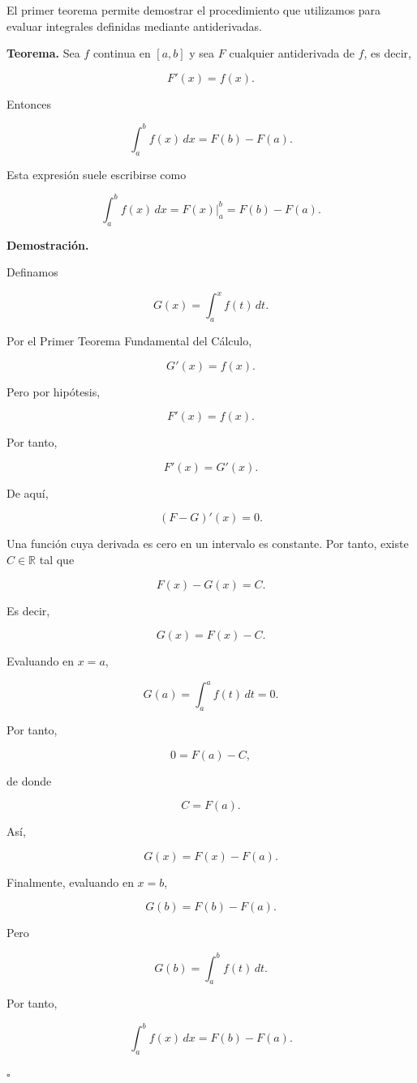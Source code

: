 \documentclass[12pt]{article}
\begin{document}
El primer teorema permite demostrar el procedimiento que utilizamos para
evaluar integrales definidas mediante antiderivadas.

\textbf{Teorema.}
Sea $f$ continua en $[a,b]$ y sea $F$ cualquier antiderivada de $f$, es
decir,

\[
F'(x)=f(x).
\]

Entonces

\[
\boxed{
\int_a^b f(x)\,dx
=
F(b)-F(a).
}
\]

Esta expresión suele escribirse como

\[
\boxed{
\int_a^b f(x)\,dx
=
\left.F(x)\right|_a^b
=
F(b)-F(a).
}
\]

\textbf{Demostración.}

Definamos

\[
G(x)
=
\int_a^x f(t)\,dt.
\]

Por el Primer Teorema Fundamental del Cálculo,

\[
G'(x)=f(x).
\]

Pero por hipótesis,

\[
F'(x)=f(x).
\]

Por tanto,

\[
F'(x)=G'(x).
\]

De aquí,

\[
(F-G)'(x)=0.
\]

Una función cuya derivada es cero en un intervalo es constante. Por tanto,
existe $C\in\mathbb{R}$ tal que

\[
F(x)-G(x)=C.
\]

Es decir,

\[
G(x)=F(x)-C.
\]

Evaluando en $x=a$,

\[
G(a)
=
\int_a^a f(t)\,dt
=
0.
\]

Por tanto,

\[
0=F(a)-C,
\]

de donde

\[
C=F(a).
\]

Así,

\[
G(x)=F(x)-F(a).
\]

Finalmente, evaluando en $x=b$,

\[
G(b)=F(b)-F(a).
\]

Pero

\[
G(b)
=
\int_a^b f(t)\,dt.
\]

Por tanto,

\[
\boxed{
\int_a^b f(x)\,dx
=
F(b)-F(a).
}
\]

\hfill$\square$
\end{document}
